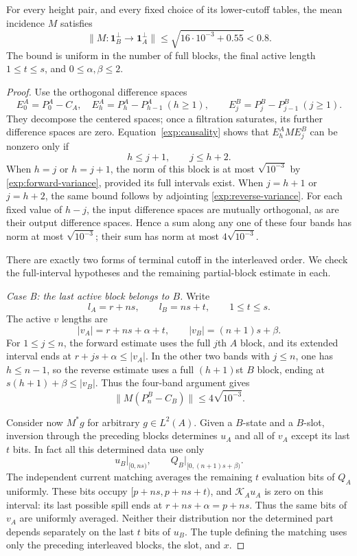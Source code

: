 \begin{lemma}\label{exp:mean-gap}
For every height pair, and every fixed choice of its lower-cutoff
tables, the mean incidence $M$ satisfies
\[
 \big\|M:\mathbf1_B^\perp\longrightarrow
                   \mathbf1_A^\perp\big\|
 \leq\sqrt{16\cdot10^{-3}+0.55}<0.8.
\]
The bound is uniform in the number of full blocks, the final active
length $1\leq t\leq s$, and $0\leq\alpha,\beta\leq2$.
\end{lemma}

\begin{proof}
Use the orthogonal difference spaces
\[
 E_0^A=P_0^A-C_A,\quad E_h^A=P_h^A-P_{h-1}^A\ (h\geq1),
 \qquad E_j^B=P_j^B-P_{j-1}^B\ (j\geq1).
\]
They decompose the centered spaces; once a filtration saturates,
its further difference spaces are zero. Equation~\eqref{exp:causality}
shows that $E_h^AME_j^B$ can be nonzero only if
\begin{equation}
 h\leq j+1,\qquad j\leq h+2.
 \label{exp:four-bands}
\end{equation}
When $h=j$ or $h=j+1$, the norm of this block is at most
$\sqrt{10^{-3}}$ by \eqref{exp:forward-variance}, provided its
full intervals exist. When $j=h+1$ or $j=h+2$, the same bound
follows by adjointing \eqref{exp:reverse-variance}. For each fixed
value of $h-j$, the input difference spaces are mutually orthogonal,
as are their output difference spaces. Hence a sum along any one
of these four bands has norm at most $\sqrt{10^{-3}}$; their sum
has norm at most $4\sqrt{10^{-3}}$.

There are exactly two forms of terminal cutoff in the interleaved
order. We check the full-interval hypotheses and the remaining
partial-block estimate in each.

\smallskip\noindent
\emph{Case B: the last active block belongs to $B$.}
Write
\[
 l_A=r+ns,\qquad l_B=ns+t,\qquad 1\leq t\leq s.
\]
The active $v$ lengths are
\[
 |v_A|=r+ns+\alpha+t,
 \qquad |v_B|=(n+1)s+\beta.
\]
For $1\leq j\leq n$, the forward estimate uses the full $j$th
$A$ block, and its extended interval ends at
$r+js+\alpha\leq|v_A|$. In the other two bands with $j\leq n$,
one has $h\leq n-1$, so the reverse estimate uses a full
$(h+1)$st $B$ block, ending at $s(h+1)+\beta\leq|v_B|$.
Thus the four-band argument gives
\begin{equation}
 \|M(P_n^B-C_B)\|\leq4\sqrt{10^{-3}}.
 \label{exp:low-B}
\end{equation}

Consider now $M^*g$ for arbitrary $g\in L^2(A)$. Given a $B$-state
and a $B$-slot, inversion through the preceding blocks determines
$u_A$ and all of $v_A$ except its last $t$ bits. In fact all this
determined data use only
\[
 u_B\big|_{[0,ns)},\qquad
 Q_B\big|_{[0,(n+1)s+\beta)}.
\]
The independent current matching averages the remaining $t$
evaluation bits of $Q_A$ uniformly. These bits occupy
$[p+ns,p+ns+t)$, and $\mathcal K_Au_A$ is zero on this interval:
its last possible spill ends at $r+ns+\alpha=p+ns$.
Thus the same bits of $v_A$ are uniformly averaged. Neither their
distribution nor the determined part depends separately on the last
$t$ bits of $u_B$. The tuple defining the matching uses only the
preceding interleaved blocks, the slot, and $x$.


\end{proof}
